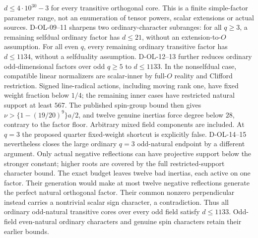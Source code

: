 \documentclass[11pt]{article}
\theoremstyle{remark}\newtheorem{remark}[theorem]{Remark}
\begin{document}
$d\le4\cdot10^{30}-3$ for every transitive orthogonal core.
This is a finite simple-factor parameter range, not an enumeration
of tensor powers, scalar extensions or actual sources.
D-OL-09--11 sharpens two ordinary-character subranges: for all $q\ge3$,
a remaining selfdual ordinary factor has $d\le21$, without an
extension-to-$O$ assumption. For all even $q$, every remaining ordinary
transitive factor has $d\le1134$, without a selfduality assumption.
D-OL-12--13 further reduces ordinary odd-dimensional factors over odd
$q\ge5$ to $d\le1133$. In the nonselfdual case, compatible linear
normalizers are scalar-inner by full-$O$ reality and Clifford restriction.
Signed line-radical actions, including moving rank one, have fixed weight
fraction below $1/4$; the remaining inner cases have restricted natural
support at least $567$. The published spin-group bound then gives
$\nu>\{1-(19/20)^9\}a/2$, and twelve genuine inertias force degree
below $28$, contrary to the factor floor. Arbitrary mixed field components
are included. At $q=3$ the proposed quarter fixed-weight shortcut is
explicitly false. D-OL-14--15 nevertheless closes the large ordinary
$q=3$ odd-natural endpoint by a different argument. Only actual negative
reflections can have projective support below the stronger constant;
higher roots are covered by the full restricted-support character bound.
The exact budget leaves twelve bad inertias, each active on one factor.
Their generation would make at most twelve negative reflections generate
the perfect natural orthogonal factor. Their common nonzero perpendicular
instead carries a nontrivial scalar sign character, a contradiction.
Thus all ordinary odd-natural transitive cores over every odd field
satisfy $d\le1133$. Odd-field even-natural ordinary characters and
genuine spin characters retain their earlier bounds.
\end{document}
